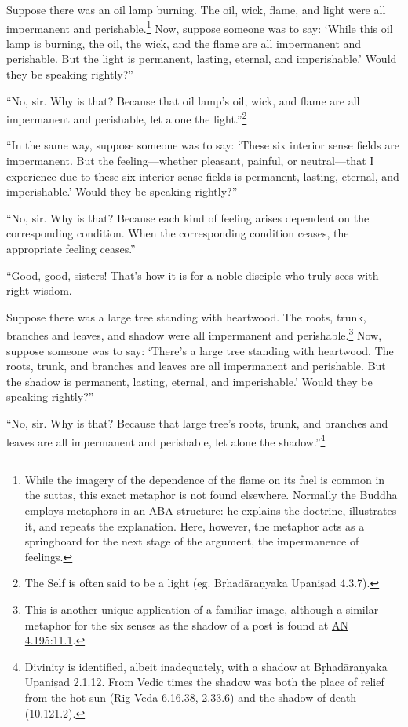 \documentclass[12pt,openany]{book}%
\begin{document}
Suppose there was an oil lamp burning. The oil, wick, flame, and light were all impermanent and perishable.\footnote{While the imagery of the dependence of the flame on its fuel is common in the suttas, this exact metaphor is not found elsewhere. Normally the Buddha employs metaphors in an ABA structure: he explains the doctrine, illustrates it, and repeats the explanation. Here, however, the metaphor acts as a springboard for the next stage of the argument, the impermanence of feelings. } Now, suppose someone was to say: ‘While this oil lamp is burning, the oil, the wick, and the flame are all impermanent and perishable. But the light is permanent, lasting, eternal, and imperishable.’ Would they be speaking rightly?” 

“No, sir. Why is that? Because that oil lamp’s oil, wick, and flame are all impermanent and perishable, let alone the light.”\footnote{The Self is often said to be a light (eg. \textsanskrit{Bṛhadāraṇyaka} \textsanskrit{Upaniṣad} 4.3.7). } 

“In the same way, suppose someone was to say: ‘These six interior sense fields are impermanent. But the feeling—whether pleasant, painful, or neutral—that I experience due to these six interior sense fields is permanent, lasting, eternal, and imperishable.’ Would they be speaking rightly?” 

“No, sir. Why is that? Because each kind of feeling arises dependent on the corresponding condition. When the corresponding condition ceases, the appropriate feeling ceases.” 

“Good, good, sisters! That’s how it is for a noble disciple who truly sees with right wisdom. 

Suppose there was a large tree standing with heartwood. The roots, trunk, branches and leaves, and shadow were all impermanent and perishable.\footnote{This is another unique application of a familiar image, although a similar metaphor for the six senses as the shadow of a post is found at \href{https://suttacentral.net/an4.195/en/sujato\#11.1}{AN 4.195:11.1}. } Now, suppose someone was to say: ‘There’s a large tree standing with heartwood. The roots, trunk, and branches and leaves are all impermanent and perishable. But the shadow is permanent, lasting, eternal, and imperishable.’ Would they be speaking rightly?” 

“No, sir. Why is that? Because that large tree’s roots, trunk, and branches and leaves are all impermanent and perishable, let alone the shadow.”\footnote{Divinity is identified, albeit inadequately, with a shadow at \textsanskrit{Bṛhadāraṇyaka} \textsanskrit{Upaniṣad} 2.1.12. From Vedic times the shadow was both the place of relief from the hot sun (Rig Veda 6.16.38, 2.33.6) and the shadow of death (10.121.2). } 
\end{document}
